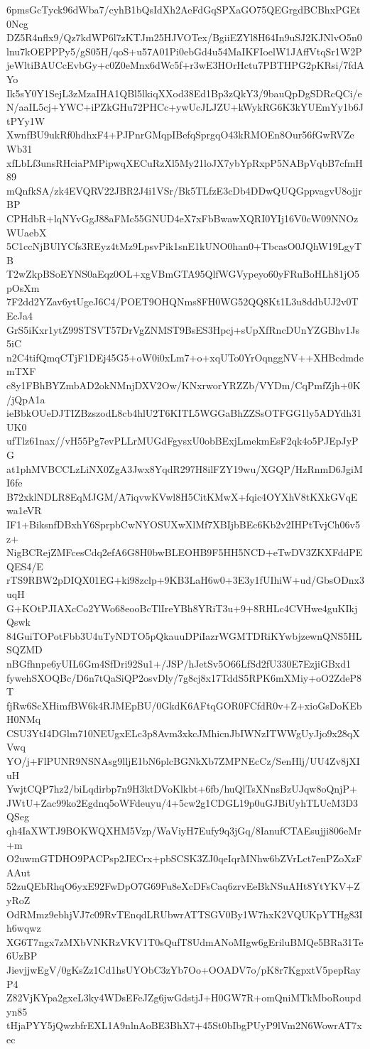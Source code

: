 6pmsGcTyck96dWba7/cyhB1bQsIdXh2AeFdGqSPXaGO75QEGrgdBCBhxPGEt0Ncg
DZ5R4nflx9/Qz7kdWP6l7zKTJm25HJVOTex/BgiiEZYl8H64In9uSJ2KJNlvO5n0
lnu7kOEPPPy5/gS05H/qoS+u57A01Pi0ebGd4u54MaIKFIoelW1JAffVtqSr1W2P
jeWltiBAUCcEvbGy+c0Z0eMnx6dWc5f+r3wE3HOrHctu7PBTHPG2pKRsi/7fdAYo
Ik5sY0Y1SejL3zMzaIHA1QBl5lkiqXXod38Ed1Bp3zQkY3/9bauQpDgSDRcQCi/e
N/aaIL5cj+YWC+iPZkGHu72PHCc+ywUcJLJZU+kWykRG6K3kYUEmYy1b6JtPYy1W
XwnfBU9ukRf0hdhxF4+PJPnrGMqpIBefqSprgqO43kRMOEn8Our56fGwRVZeWb31
xfLbLf3unsRHciaPMPipwqXECuRzXl5My21loJX7ybYpRxpP5NABpVqbB7cfmH89
mQnfkSA/zk4EVQRV22JBR2J4i1VSr/Bk5TLfzE3cDb4DDwQUQGppvagvU8ojjrBP
CPHdbR+lqNYvGgJ88aFMc55GNUD4eX7xFbBwawXQRI0YIj16V0cW09NNOzWUaebX
5C1ccNjBUlYCfs3REyz4tMz9LpsvPik1snE1kUNO0han0+TbcasO0JQhW19LgyTB
T2wZkpBSoEYNS0aEqz0OL+xgVBmGTA95QlfWGVypeyo60yFRuBoHLh81jO5pOsXm
7F2dd2YZav6ytUgeJ6C4/POET9OHQNms8FH0WG52QQ8Kt1L3u8ddbUJ2v0TEcJa4
GrS5iKxr1ytZ99STSVT57DrVgZNMST9BsES3Hpcj+sUpXfRncDUnYZGBhv1Js5iC
n2C4tifQmqCTjF1DEj45G5+oW0i0xLm7+o+xqUTo0YrOqnggNV++XHBcdmdemTXF
c8y1FBhBYZmbAD2okNMnjDXV2Ow/KNxrworYRZZb/VYDm/CqPmfZjh+0K/jQpA1a
ieBbkOUeDJTIZBzszodL8cb4hlU2T6KITL5WGGaBhZZSsOTFGG1ly5ADYdh31UK0
ufTlz61nax//vH55Pg7evPLLrMUGdFgysxU0obBExjLmekmEsF2qk4o5PJEpJyPG
at1phMVBCCLzLiNX0ZgA3Jwx8YqdR297H8ilFZY19wu/XGQP/HzRnmD6JgiMI6fe
B72xklNDLR8EqMJGM/A7iqvwKVwl8H5CitKMwX+fqic4OYXhV8tKXkGVqEwa1eVR
IF1+BiksnfDBxhY6SprpbCwNYOSUXwXlMf7XBIjbBEc6Kb2v2IHPtTvjCh06v5z+
NigBCRejZMFcesCdq2efA6G8H0bwBLEOHB9F5HH5NCD+eTwDV3ZKXFddPEQES4/E
rTS9RBW2pDIQX01EG+ki98zclp+9KB3LaH6w0+3E3y1fUIhiW+ud/GbsODnx3uqH
G+KOtPJIAXcCo2YWo68eooBcTlIreYBh8YRiT3u+9+8RHLc4CVHwe4guKIkjQswk
84GuiTOPotFbb3U4uTyNDTO5pQkauuDPiIazrWGMTDRiKYwbjzewnQNS5HLSQZMD
nBGfhnpe6yUIL6Gm4SfDri92Su1+/JSP/hJetSv5O66LfSd2fU330E7EzjiGBxd1
fywehSXOQBc/D6n7tQaSiQP2osvDly/7g8cj8x17TddS5RPK6mXMiy+oO2ZdeP8T
fjRw6ScXHimfBW6k4RJMEpBU/0GkdK6AFtqGOR0FCfdR0v+Z+xioGsDoKEbH0NMq
CSU3YtI4DGlm710NEUgxELc3p8Avm3xkcJMhicnJbIWNzITWWgUyJjo9x28qXVwq
YO/j+FlPUNR9NSNAsg9lljE1bN6plcBGNkXb7ZMPNEcCz/SenHlj/UU4Zv8jXIuH
YwjtCQP7hz2/biLqdirbp7n9H3ktDVoKlkbt+6fb/huQlTsXNnsBzUJqw8oQnjP+
JWtU+Zac99ko2Egdnq5oWFdeuyu/4+5cw2g1CDGL19p0uGJBiUyhTLUcM3D3QSeg
qh4IaXWTJ9BOKWQXHM5Vzp/WaViyH7Eufy9q3jGq/8IanufCTAEsujji806eMr+m
O2uwmGTDHO9PACPsp2JECrx+pbSCSK3ZJ0qeIqrMNhw6bZVrLct7enPZoXzFAAut
52zuQEbRhqO6yxE92FwDpO7G69Fu8eXcDFsCaq6zrvEeBkNSuAHt8YtYKV+ZyRoZ
OdRMmz9ebhjVJ7c09RvTEnqdLRUbwrATTSGV0By1W7hxK2VQUKpYTHg83Ih6wqwz
XG6T7ngx7zMXbVNKRzVKV1T0sQufT8UdmANoMIgw6gEriluBMQe5BRa31Te6UzBP
JievjjwEgV/0gKsZz1Cd1hsUYObC3zYb7Oo+OOADV7o/pK8r7KgpxtV5pepRayP4
Z82VjKYpa2gxeL3ky4WDsEFeJZg6jwGdstjJ+H0GW7R+omQniMTkMboRoupdyn85
tHjaPYY5jQwzbfrEXL1A9nlnAoBE3BhX7+45St0bIbgPUyP9lVm2N6WowrAT7xec

